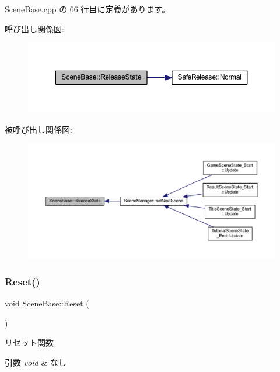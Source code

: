  Scene\+Base.\+cpp の 66 行目に定義があります。

呼び出し関係図\+:
\nopagebreak
\begin{figure}[H]
\begin{center}
\leavevmode
\includegraphics[width=350pt]{class_scene_base_aaa1e66fbfc6740b069d715b325915b97_cgraph}
\end{center}
\end{figure}
被呼び出し関係図\+:
\nopagebreak
\begin{figure}[H]
\begin{center}
\leavevmode
\includegraphics[width=350pt]{class_scene_base_aaa1e66fbfc6740b069d715b325915b97_icgraph}
\end{center}
\end{figure}
\mbox{\label{class_scene_base_ae2dc09554ec21ffe231fa73a6cdd7ca1}} 
\subsubsection{\texorpdfstring{Reset()}{Reset()}}
{\footnotesize\ttfamily void Scene\+Base\+::\+Reset (\begin{DoxyParamCaption}{ }\end{DoxyParamCaption})}



リセット関数 


\begin{DoxyParams}{引数}
{\em void} & なし \\
\hline
\end{DoxyParams}

